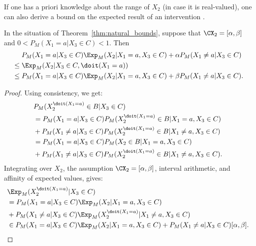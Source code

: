 If one has a priori knowledge about the range of $X_2$ (in case it is real-valued), one can also derive a bound on the expected result of an intervention \cite{ManskiPepper2013}.
\begin{Cor}\label{cor:natural_bounds}
  In the situation of Theorem~\ref{thm:natural_bounds}, suppose that $\CX_2 = [\alpha,\beta]$ and $0 < P_M(X_1=a|X_3\in C) < 1$. Then
  \begin{equation}\label{eq:natural_bounds_CATE}\begin{split}
    & P_M(X_1=a|X_3\in C) \Exp_M(X_2|X_1=a,X_3\in C) + \alpha P_M(X_1\ne a|X_3\in C) \\
    {}\le {}& \Exp_M(X_2|X_3\in C,\doit(X_1=a)) \\
    {}\le {}& P_M(X_1=a|X_3\in C) \Exp_M(X_2|X_1=a,X_3\in C) + \beta P_M(X_1\ne a|X_3\in C).
  \end{split}\end{equation}
\end{Cor}
\begin{proof}
Using consistency, we get:
\begin{equation*}\begin{split}
  &P_M(X_2^{\doit(X_1=a)} \in B|X_3\in C) \\
  &= P_M(X_1=a|X_3\in C)  P_M(X_2^{\doit(X_1=a)} \in B|X_1=a,X_3\in C)  \\
  & + P_M(X_1 \ne a|X_3\in C) P_M(X_2^{\doit(X_1=a)} \in B|X_1\ne a,X_3\in C) \\
  &= P_M(X_1=a|X_3\in C)  P_M(X_2 \in B|X_1=a,X_3\in C)  \\
  & + P_M(X_1 \ne a|X_3\in C) P_M(X_2^{\doit(X_1=a)} \in B|X_1\ne a,X_3\in C).
\end{split}\end{equation*}
Integrating over $X_2$, the assumption $\CX_2 = [\alpha,\beta]$, interval arithmetic, and affinity of expected values, gives:
\begin{equation*}\begin{split}
  &\Exp_M(X_2^{\doit(X_1=a)}|X_3\in C) \\
  &= P_M(X_1=a|X_3\in C) \Exp_M(X_2|X_1=a,X_3\in C)  \\
  &+ P_M(X_1 \ne a|X_3\in C) \Exp_M(X_2^{\doit(X_1=a)}|X_1\ne a,X_3\in C) \\
  &\in P_M(X_1=a|X_3\in C) \Exp_M(X_2|X_1=a,X_3\in C) + P_M(X_1 \ne a|X_3\in C) [\alpha,\beta].
\end{split}\end{equation*}
\end{proof}
